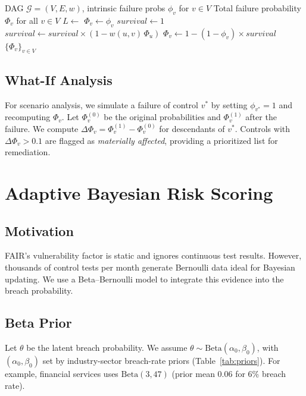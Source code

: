 \documentclass[conference]{IEEEtran}
\begin{document}
\begin{algorithm}
  \caption{Cascade Risk Propagation (CRP)}
  \label{alg:crp}
  \begin{algorithmic}[1]
    \Require DAG $\mathcal{G}=(V,E,w)$, intrinsic failure probs $\phi_v$ for $v\in V$
    \Ensure Total failure probability $\Phi_v$ for all $v\in V$
    \State $L \leftarrow$ 
        \State $\Phi_v \leftarrow \phi_v$
      \Else
        \State $survival \leftarrow 1$
          \State $survival \leftarrow survival \times (1 - w(u,v)\,\Phi_u)$
        \EndFor
        \State $\Phi_v \leftarrow 1 - (1 - \phi_v)\times survival$
      \EndIf
    \EndFor
    \State \Return $\{\Phi_v\}_{v\in V}$
  \end{algorithmic}
\end{algorithm}

\subsection{What-If Analysis}
For scenario analysis, we simulate a failure of control $v^*$ by setting $\phi_{v^*}=1$ and recomputing $\Phi_v$. Let $\Phi_v^{(0)}$ be the original probabilities and $\Phi_v^{(1)}$ after the failure. We compute $\Delta\Phi_v = \Phi_v^{(1)} - \Phi_v^{(0)}$ for descendants of $v^*$. Controls with $\Delta\Phi_v > 0.1$ are flagged as \emph{materially affected}, providing a prioritized list for remediation.

\section{Adaptive Bayesian Risk Scoring}
\label{sec:abrs}

\subsection{Motivation}
FAIR's vulnerability factor is static and ignores continuous test results. However, thousands of control tests per month generate Bernoulli data ideal for Bayesian updating. We use a Beta--Bernoulli model to integrate this evidence into the breach probability.

\subsection{Beta Prior}
Let $\theta$ be the latent breach probability. We assume $\theta\sim \mathrm{Beta}(\alpha_0,\beta_0)$, with $(\alpha_0,\beta_0)$ set by industry-sector breach-rate priors (Table~\ref{tab:priors}). For example, financial services uses $\mathrm{Beta}(3,47)$ (prior mean $0.06$ for 6\% breach rate).
\end{document}
